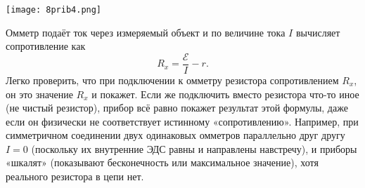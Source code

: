 \documentclass[12pt, a4paper]{article}%
\begin{document}
\begin{center}
\texttt{[image: 8prib4.png]}
\label{fig:mpr}
\end{center}



Омметр подаёт ток через измеряемый объект и по величине тока $I$ вычисляет сопротивление как  
\[
R_x = \frac{\mathscr{E}}{I} - r.
\]
Легко проверить, что при подключении к омметру резистора сопротивлением $R_x$, он это значение $R_x$ и покажет. Если же подключить вместо резистора что-то иное (не чистый резистор), прибор всё равно покажет результат этой формулы, даже если он физически не соответствует истинному «сопротивлению». Например, при симметричном соединении двух одинаковых омметров параллельно друг другу $I=0$ (поскольку их внутренние ЭДС равны и направлены навстречу), и приборы «шкалят» (показывают бесконечность или максимальное значение), хотя реального резистора в цепи нет.
\end{document}

